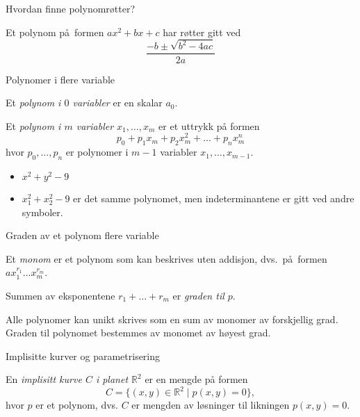 \documentclass[norsk]{beamer}
\begin{document}
\begin{frame}{Hvordan finne polynomrøtter?}
    \begin{lemma}
        Et polynom på formen $ax^2 + bx + c$
        har røtter gitt ved
        \[
            \frac {
                -b \pm \sqrt{b^2 - 4ac}
            }{2a}
        \]
    \end{lemma}
\end{frame}

\begin{frame}{Polynomer i flere variable}
    \begin{definition}
        Et \textit{polynom i $0$ variabler} er en skalar $a_0$.

        Et \textit{polynom i $m$ variabler $x_1,\dots,x_m$} er et uttrykk på
        formen
        \[
            p_0 + p_1 x_m + p_2 x_m^2 + \dots + p_n x_m^n
        \]
        hvor $p_0,\dots, p_n$ er polynomer i $m - 1$ variabler
        $x_1,\dots, x_{m - 1}$.
    \end{definition}
    \begin{example}
        \begin{itemize}
            \item $x^2 + y^2 - 9$
            \item $x_1^2 + x_2^2 - 9$ er det samme polynomet,
                men indeterminantene er gitt ved andre symboler.
        \end{itemize}
    \end{example}
\end{frame}

\begin{frame}{Graden av et polynom flere variable}
    \begin{definition}
        Et \textit{monom} er et polynom som kan beskrives uten addisjon,
        dvs.\ på formen $a x_1^{r_1}\dots x_m^{r_m}$.

        Summen av eksponentene $r_1 + \dots + r_m$ er \textit{graden til $p$}.
    \end{definition}
    Alle polynomer kan unikt skrives som en sum av monomer av forskjellig grad.
    Graden til polynomet bestemmes av monomet av høyest grad.
\end{frame}

\begin{frame}{Implisitte kurver og parametrisering}
    \begin{definition}
        En \textit{implisitt kurve $C$ i planet $\mathbb R^2$}
        er en mengde på formen
        \[
            C = \{ (x,y)\in \mathbb R^2 \mid p(x,y) = 0\},
        \]
        hvor $p$ er et polynom,
        dvs. $C$ er mengden av løsninger til likningen $p(x,y) = 0$.
    \end{definition}
\end{frame}
\end{document}
